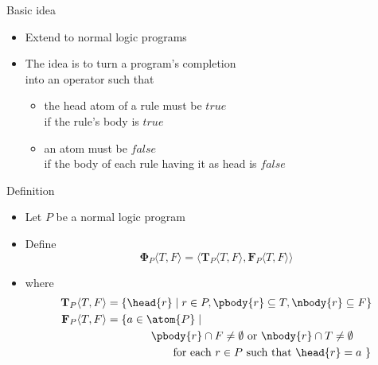 \begin{frame}{Basic idea}
  \bigskip
  \begin{itemize}
  \item {} Extend  to normal logic programs
    \medskip
  \item {}
    The idea is to turn a program's completion\\ into an operator such that
    \smallskip
    \begin{itemize}
    \item the head atom of a rule must be $\mathit{true}$\\
      if the rule's body is $\mathit{true}$
    \item an atom must be $\mathit{false}$\\
      if the body of each rule having it as head is $\mathit{false}$
    \end{itemize}
  \end{itemize}
\end{frame}
\begin{frame}{Definition}
  \bigskip
  \begin{itemize}
  \item<1-> Let $P$ be a normal logic program
  \item<2-> Define
    \[
    {\mathbf{\Phi}}_P\langle T,F \rangle
    =
    \langle
    {\mathbf{T}}_P\langle T,F \rangle,
    {\mathbf{F}}_P\langle T,F \rangle
    \rangle
    \]
  \item<2-> []
    where
    \begin{align*}
      {\mathbf{T}}_P\langle T,F \rangle
      & =
      \{  \head{r} \mid r \in P, \pbody{r} \subseteq T, \nbody{r} \subseteq F  \}
      \\
      {\mathbf{F}}_P\langle T,F \rangle
      & =
      \{  a \in \atom{P} \mid
      \\ &  \qquad\qquad
      \pbody{r} \cap F \neq \emptyset
      \text{ or }
      \nbody{r} \cap T \neq \emptyset
      \\ &  \qquad\qquad\qquad
      \text{for each } r \in P
      \text{ such that }
      \head{r} = a
      \ \}
    \end{align*}
  \end{itemize}
\end{frame}
